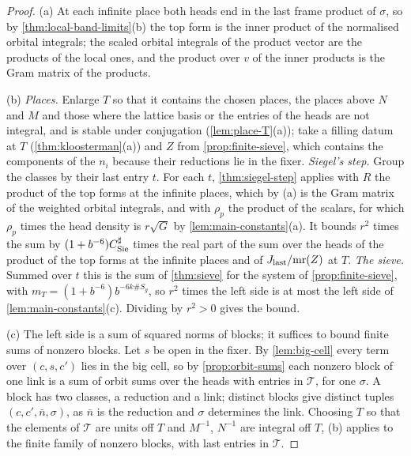 \begin{proof}
(a) At each infinite place both heads end in the last frame product of $\sigma$, so by \cref{thm:local-band-limits}(b) the top form is the inner product of the normalised orbital integrals; the scaled orbital integrals of the
product vector are the products of the local ones, and the product over $v$ of the inner products is the Gram matrix of the products.

(b) \emph{Places.} Enlarge $T$ so that it contains the chosen places, the places above $N$ and $M$ and those where the lattice basis or the entries of the heads are not integral, and is stable under conjugation
(\cref{lem:place-T}(a)); take a filling datum at $T$ (\cref{thm:kloosterman}(a)) and $Z$ from \cref{prop:finite-sieve}, which contains the components of the $n_i$ because their reductions lie in the fixer. \emph{Siegel's step.} Group the
classes by their last entry $t$. For each $t$, \cref{thm:siegel-step} applies with $R$ the product of the top forms at the infinite places, which by (a) is the Gram matrix of the weighted orbital integrals, and with
$\rho_p$ the product of the scalars, for which $\rho_p$ times the head density is $r\sqrt G$ by \cref{lem:main-constants}(a). It bounds $r^2$ times the sum by $(1+b^{-6})C^\sharp_{\rm Sie}$ times the real part of the sum over the
heads of the product of the top forms at the infinite places and of $J_{\rm last}/\mathrm{mr}(Z)$ at $T$. \emph{The sieve.} Summed over $t$ this is the sum of \cref{thm:sieve} for the system of \cref{prop:finite-sieve}, with
$m_T=(1+b^{-6})b^{-6k\#S_g}$, so $r^2$ times the left side is at most the left side of \cref{lem:main-constants}(c). Dividing by $r^2>0$ gives the bound.

(c) The left side is a sum of squared norms of blocks; it suffices to bound finite sums of nonzero blocks. Let $s$ be open in the fixer. By \cref{lem:big-cell} every term over $(c,s,c')$ lies in the big cell, so by
\cref{prop:orbit-sums} each nonzero block of one link is a sum of orbit sums over the heads with entries in $\mathcal T$, for one $\sigma$. A block has two classes, a reduction and a link; distinct blocks give distinct tuples
$(c,c',\bar n,\sigma)$, as $\bar n$ is the reduction and $\sigma$ determines the link. Choosing $T$ so that the elements of $\mathcal T$ are units off $T$ and $M^{-1}$, $N^{-1}$ are integral off $T$, (b) applies to the finite family of
nonzero blocks, with last entries in $\mathcal T$.
\end{proof}
